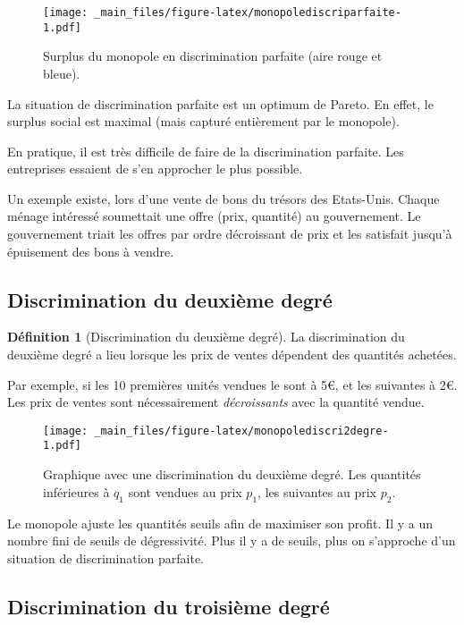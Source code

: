 \documentclass[
  a4paper,
]{book}
\theoremstyle{definition}
\newtheorem{definition}{Définition}[chapter]
\theoremstyle{definition}
\theoremstyle{definition}
\theoremstyle{definition}
\theoremstyle{remark}
\begin{document}
\begin{figure}
\centering
\texttt{[image: \_main\_files/figure-latex/monopolediscriparfaite-1.pdf]}
\caption{\label{fig:monopolediscriparfaite}Surplus du monopole en discrimination parfaite (aire rouge et bleue).}
\end{figure}

La situation de discrimination parfaite est un optimum de Pareto.
En effet, le surplus social est maximal (mais capturé entièrement par le monopole).

En pratique, il est très difficile de faire de la discrimination parfaite.
Les entreprises essaient de s'en approcher le plus possible.

Un exemple existe, lors d'une vente de bons du trésors des Etats-Unis.
Chaque ménage intéressé soumettait une offre (prix, quantité) au gouvernement.
Le gouvernement triait les offres par ordre décroissant de prix et les satisfait jusqu'à épuisement des bons à vendre.

\hypertarget{discrimination-du-deuxiuxe8me-degruxe9}{%
\subsection{Discrimination du deuxième degré}\label{discrimination-du-deuxiuxe8me-degruxe9}}

\begin{definition}[Discrimination du deuxième degré]
La discrimination du deuxième degré a lieu lorsque les prix de ventes dépendent des quantités achetées.
\end{definition}

Par exemple, si les 10 premières unités vendues le sont à 5€, et les suivantes à 2€.
Les prix de ventes sont nécessairement \emph{décroissants} avec la quantité vendue.

\begin{figure}
\centering
\texttt{[image: \_main\_files/figure-latex/monopolediscri2degre-1.pdf]}
\caption{\label{fig:monopolediscri2degre}Graphique avec une discrimination du deuxième degré. Les quantités inférieures à \(q_1\) sont vendues au prix \(p_1\), les suivantes au prix \(p_2\).}
\end{figure}

Le monopole ajuste les quantités seuils afin de maximiser son profit.
Il y a un nombre fini de seuils de dégressivité.
Plus il y a de seuils, plus on s'approche d'un situation de discrimination parfaite.

\hypertarget{discrimination-du-troisiuxe8me-degruxe9}{%
\subsection{Discrimination du troisième degré}\label{discrimination-du-troisiuxe8me-degruxe9}}
\end{document}
